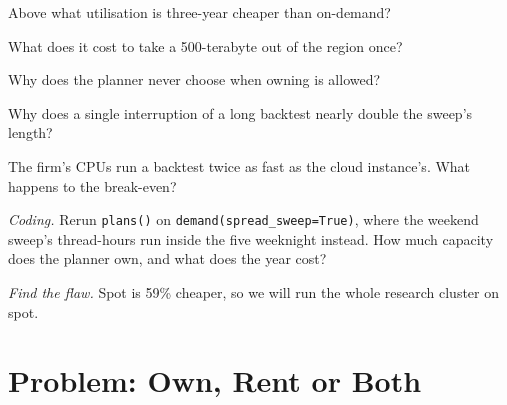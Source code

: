 \begin{exercise}[$\star$]\label{exo:pl:cloud-against-on-premises:2}
Above what utilisation is three-year  cheaper than on-demand?
\end{exercise}

\begin{exercise}[$\star$]\label{exo:pl:cloud-against-on-premises:3}
What does it cost to take a 500-terabyte  out of the region once?
\end{exercise}

\begin{exercise}[$\star\star$]\label{exo:pl:cloud-against-on-premises:4}
Why does the planner never choose  when owning is allowed?
\end{exercise}

\begin{exercise}[$\star\star$]\label{exo:pl:cloud-against-on-premises:5}
Why does a single interruption of a long backtest nearly double the sweep's length?
\end{exercise}

\begin{exercise}[$\star\star$]\label{exo:pl:cloud-against-on-premises:6}
The firm's CPUs run a backtest twice as fast as the cloud instance's. What happens to the break-even?
\end{exercise}

\begin{exercise}[$\star\star\star$]\label{exo:pl:cloud-against-on-premises:7}
\emph{Coding.} Rerun \texttt{plans()} on \texttt{demand(spread\_sweep=True)}, where the weekend sweep's thread-hours run inside the five
weeknight  instead. How much capacity does the planner own, and what does the year cost?
\end{exercise}

\begin{exercise}[$\star\star\star$]\label{exo:pl:cloud-against-on-premises:8}
\emph{Find the flaw.} \textquotedbl{}Spot is 59\% cheaper, so we will run the whole research cluster on spot.\textquotedbl{}
\end{exercise}

\section{Problem: Own, Rent or Both}

